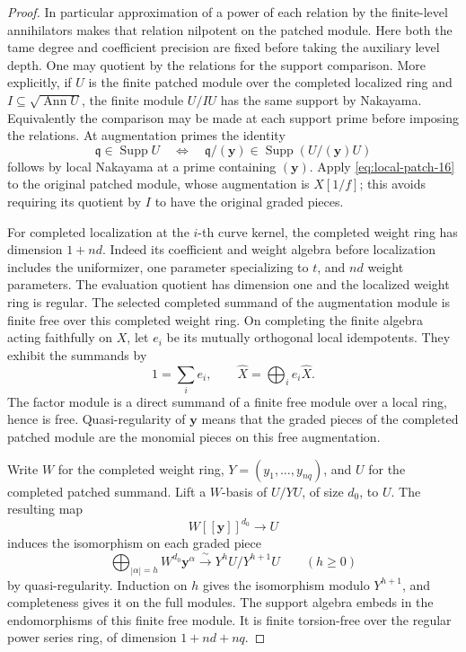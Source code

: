 \begin{proof}
In particular approximation of a power
of each relation by the finite-level annihilators
makes that relation nilpotent on the patched
module. Here both the tame degree and coefficient
precision are fixed before taking the auxiliary
level depth. One may quotient by the relations
for the support comparison. More explicitly,
if \(U\) is the finite patched module over the
completed localized ring and
\(I\subseteq\sqrt{\operatorname{Ann}U}\), the
finite module \(U/IU\) has the same support by
Nakayama. Equivalently the comparison may be
made at each support prime before imposing the
relations. At augmentation primes the identity
\[
  \mathfrak q\in\operatorname{Supp}U
  \quad\Longleftrightarrow\quad
  \mathfrak q/(\mathbf y)\in
       \operatorname{Supp}(U/(\mathbf y)U)
 \tag{16}\label{eq:local-patch-16}
\]
follows by local Nakayama at a prime containing
\((\mathbf y)\). Apply \eqref{eq:local-patch-16} to the original patched
module, whose augmentation is \(X[1/f]\); this
avoids requiring its quotient by \(I\) to have
the original graded pieces.

For completed localization at the \(i\)-th
curve kernel, the completed weight ring has
dimension \(1+nd\). Indeed its coefficient and
weight algebra before localization includes
the uniformizer, one parameter specializing
to \(t\), and \(nd\) weight parameters. The
evaluation quotient has dimension one and
the localized weight ring is regular. The
selected completed summand of the augmentation
module is finite free over this completed weight
ring. On completing the finite algebra acting faithfully on \(X\), let \(e_i\) be its mutually orthogonal local idempotents. They exhibit the summands by
\[
 1=\sum_i e_i,\qquad \widehat X=\bigoplus_i e_i\widehat X .
\]
The factor module is a direct summand of a finite
free module over a local ring, hence is free.
Quasi-regularity of \(\mathbf y\) means that the
graded pieces of the completed patched module are
the monomial pieces on this free augmentation.

Write \(W\) for the completed weight ring, \(Y=(y_1,\ldots,y_{nq})\), and \(U\) for the completed patched summand. Lift a \(W\)-basis of \(U/YU\), of size \(d_0\), to \(U\). The resulting map
\[
  W[[\mathbf y]]^{d_0}\longrightarrow U
\]
induces the isomorphism on each graded piece
\[
 \bigoplus_{|\alpha|=h}W^{d_0}\mathbf y^\alpha
      \xrightarrow{\ \sim\ }Y^hU/Y^{h+1}U\qquad(h\ge0)
\]
by quasi-regularity. Induction on \(h\) gives the isomorphism modulo \(Y^{h+1}\), and completeness gives it on the full modules. The support
algebra embeds in the endomorphisms of this
finite free module. It is finite torsion-free over
the regular power series ring, of dimension
\(1+nd+nq\).


\end{proof}
